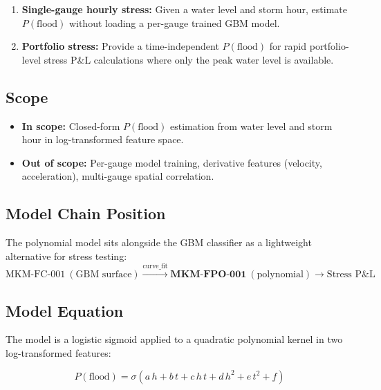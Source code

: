 \documentclass[11pt,a4paper]{article}
\begin{document}
\begin{enumerate}[nosep]
    \item \textbf{Single-gauge hourly stress:} Given a water level and storm hour,
          estimate $P(\text{flood})$ without loading a per-gauge trained GBM model.
    \item \textbf{Portfolio stress:} Provide a time-independent $P(\text{flood})$
          for rapid portfolio-level stress P\&L calculations where only the peak
          water level is available.
\end{enumerate}

\subsection{Scope}
\begin{itemize}[nosep]
    \item \textbf{In scope:} Closed-form $P(\text{flood})$ estimation from water
          level and storm hour in log-transformed feature space.
    \item \textbf{Out of scope:} Per-gauge model training, derivative features
          (velocity, acceleration), multi-gauge spatial correlation.
\end{itemize}

\subsection{Model Chain Position}
The polynomial model sits alongside the GBM classifier as a lightweight
alternative for stress testing:
\[
\text{MKM-FC-001}\ (\text{GBM surface})
\xrightarrow{\text{curve\_fit}}
\textbf{MKM-FPO-001}\ (\text{polynomial})
\to \text{Stress P\&L}
\]

\mkmframework

\subsection{Model Equation}
The model is a logistic sigmoid applied to a quadratic polynomial kernel in two
log-transformed features:

\begin{equation}
\label{eq:flood_poly}
P(\text{flood}) = \sigma\!\left(a\,h + b\,t + c\,h\,t + d\,h^2 + e\,t^2 + f\right)
\end{equation}
\end{document}
